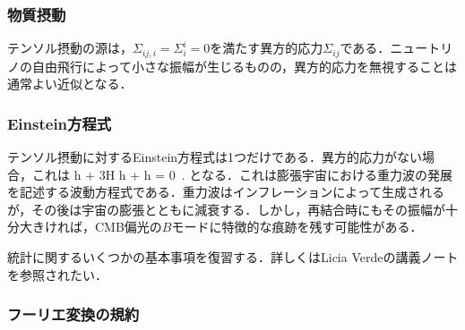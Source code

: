 \subsubsection{物質摂動}



テンソル摂動の源は，$\Sigma_{ij,i} = \Sigma^i_i =0$を満たす異方的応力$\Sigma_{ij}$である．ニュートリノの自由飛行によって小さな振幅が生じるものの，異方的応力を無視することは通常よい近似となる．



\subsubsection{Einstein方程式}



テンソル摂動に対するEinstein方程式は1つだけである．異方的応力がない場合，これは
\beq
\ddot h + 3H \dot h +  h = 0\, .
\eeq
となる．これは膨張宇宙における重力波の発展を記述する波動方程式である．重力波はインフレーションによって生成されるが，その後は宇宙の膨張とともに減衰する．しかし，再結合時にもその振幅が十分大きければ，CMB偏光の$B$モードに特徴的な痕跡を残す可能性がある．









\newpage
{}



統計に関するいくつかの基本事項を復習する．詳しくはLicia Verdeの講義ノート\cite{LiciaStats}を参照されたい．




\subsubsection{フーリエ変換の規約}%



